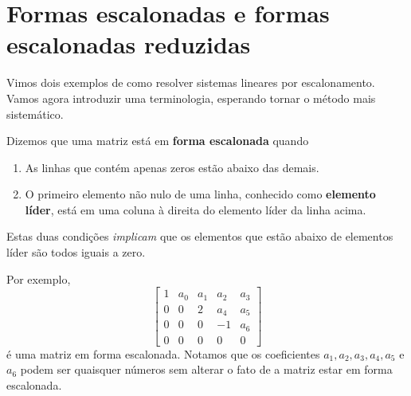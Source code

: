 \documentclass[../livro.tex]{subfiles} %
\begin{document}
\construirExer

\section{Formas escalonadas e formas escalonadas reduzidas}


Vimos dois exemplos de como resolver sistemas lineares por escalonamento. Vamos agora introduzir uma terminologia, esperando tornar o método mais sistemático.

Dizemos que uma matriz está em \textbf{forma escalonada} quando
\begin{enumerate}
  \item As linhas que contém apenas zeros estão abaixo das demais.
  \item O primeiro elemento não nulo de uma linha, conhecido como \textbf{elemento líder}, está em uma coluna à direita do elemento líder da linha acima.
\end{enumerate} Estas duas condições \emph{implicam} que os elementos que estão abaixo de elementos líder são todos iguais a zero.

Por exemplo,
\begin{equation}\label{escalonada1}
\left[
\begin{array}{ccccc}
1 & a_0 & a_1 & a_2 & a_3 \\
0 & 0 & 2 & a_4 & a_5 \\
0 & 0 & 0 & -1 & a_6 \\
0 & 0 & 0 & 0 & 0
\end{array}
\right]
\end{equation} é uma matriz em forma escalonada. Notamos que os coeficientes $a_1, a_2, a_3, a_4, a_5$ e $a_6$ podem ser quaisquer números sem alterar o fato de a matriz estar em forma escalonada.
\end{document}
